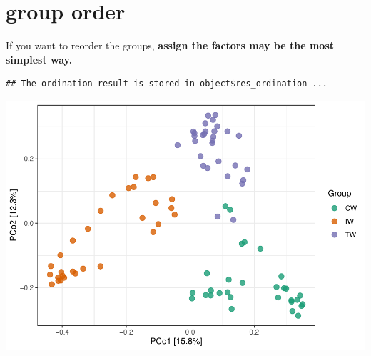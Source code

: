 \documentclass[
]{book}
\newenvironment{Shaded}{\begin{snugshade}}{\end{snugshade}}
\newcommand{\AttributeTok}[1]{\textcolor[rgb]{0.77,0.63,0.00}{#1}}
\newcommand{\FunctionTok}[1]{\textcolor[rgb]{0.00,0.00,0.00}{#1}}
\newcommand{\NormalTok}[1]{#1}
\newcommand{\OtherTok}[1]{\textcolor[rgb]{0.56,0.35,0.01}{#1}}
\newcommand{\SpecialCharTok}[1]{\textcolor[rgb]{0.00,0.00,0.00}{#1}}
\newcommand{\StringTok}[1]{\textcolor[rgb]{0.31,0.60,0.02}{#1}}
\begin{document}
\hypertarget{group-order}{%
\section{group order}\label{group-order}}

If you want to reorder the groups, \textbf{assign the factors may be the most simplest way.}

\begin{Shaded}
\end{Shaded}

\begin{verbatim}
## The ordination result is stored in object$res_ordination ...
\end{verbatim}

\begin{Shaded}
\end{Shaded}

\includegraphics{microeco-tutorial_files/figure-latex/unnamed-chunk-283-1.pdf}
\end{document}
